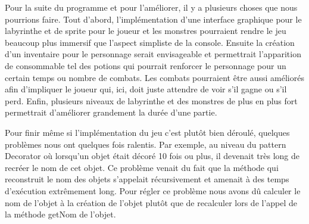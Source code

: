 \documentclass[a4paper]{article}
\begin{document}
Pour la suite du programme et pour l'améliorer, il y a plusieurs choses que nous pourrions faire.
Tout d'abord, l'implémentation d'une interface graphique pour le labyrinthe et de sprite pour le joueur et les monstres pourraient rendre le jeu beaucoup plus immersif que l'aspect simpliste de la console.
Ensuite la création d'un inventaire pour le personnage serait envisageable et permettrait l'apparition de consommable tel des potions qui pourrait renforcer le personnage pour un certain temps ou nombre de combats.
Les combats pourraient être aussi améliorés afin d'impliquer le joueur qui, ici, doit juste attendre de voir s’il gagne ou s’il perd.
Enfin, plusieurs niveaux de labyrinthe et des monstres de plus en plus fort permettrait d'améliorer grandement la durée d'une partie.

Pour finir même si l'implémentation du jeu c'est plutôt bien déroulé, quelques problèmes nous ont quelques fois ralentis.
Par exemple, au niveau du pattern Decorator où lorsqu'un objet était décoré 10 fois ou plus, il devenait très long de recréer le nom de cet objet.
Ce problème venait du fait que la méthode qui reconstruit le nom des objets s'appelait récursivement et amenait à des temps d'exécution extrêmement long.
Pour régler ce problème nous avons dû calculer le nom de l'objet à la création de l'objet plutôt que de recalculer lors de l'appel de la méthode getNom de l'objet.
\end{document}
